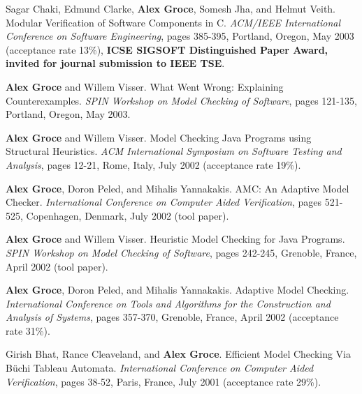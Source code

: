 \documentclass[ComputerScience]{vita}
\begin{document}
\begin{vita}
\begin{Refereed Conference and Workshop Publications}
\item 
Sagar Chaki, Edmund Clarke, {\bf Alex Groce}, Somesh Jha, and Helmut Veith.
\newblock Modular Verification of Software Components in C.
\newblock \emph{ACM/IEEE International Conference on Software Engineering}, pages 385-395, Portland, Oregon, May 2003 (acceptance rate 13\%), {\bf ICSE SIGSOFT Distinguished Paper Award, invited for journal submission to IEEE TSE}. 

\item
{\bf Alex Groce} and Willem Visser.
\newblock What Went Wrong: Explaining Counterexamples.
\newblock \emph{SPIN Workshop on Model Checking of Software}, pages 121-135, Portland, Oregon, May 2003.

\item
{\bf Alex Groce} and Willem Visser.
\newblock Model Checking Java Programs using Structural Heuristics.
\newblock \emph{ACM International Symposium on Software Testing and Analysis}, pages 12-21, Rome, Italy, July 2002 (acceptance rate 19\%).

\item
{\bf Alex Groce}, Doron Peled, and Mihalis Yannakakis.
\newblock AMC: An Adaptive Model Checker.
\newblock \emph{International Conference on Computer Aided Verification}, pages 521-525, Copenhagen, Denmark, July 2002 (tool paper).

\item
{\bf Alex Groce} and Willem Visser.
\newblock Heuristic Model Checking for Java Programs.
\newblock \emph{SPIN Workshop on Model Checking of Software}, pages 242-245, Grenoble, France, April 2002 (tool paper).

\item
{\bf Alex Groce}, Doron Peled, and Mihalis Yannakakis.
\newblock Adaptive Model Checking.
\newblock \emph{International Conference on Tools and Algorithms for the Construction and Analysis of Systems}, pages 357-370, Grenoble, France, April 2002 (acceptance rate 31\%).

\item
Girish Bhat, Rance Cleaveland, and {\bf Alex Groce}.
\newblock Efficient Model Checking Via B\"uchi Tableau Automata.
\newblock \emph{International Conference on Computer Aided Verification}, pages 38-52, Paris, France, July 2001 (acceptance rate 29\%).
\end{Refereed Conference and Workshop Publications}
















\end{vita}
\end{document}
